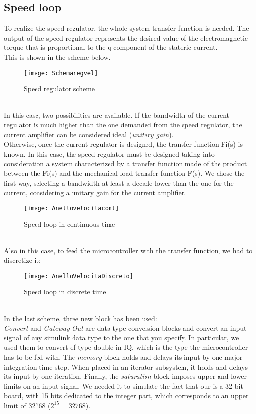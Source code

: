 \documentclass[12pt]{article}
\begin{document}
\subsection{Speed loop}
To realize the speed regulator, the whole system transfer function is needed. The output of the speed regulator represents the desired value of the electromagnetic torque that is proportional to the q component of the statoric current.\\
This is shown in the scheme below.
\begin{figure}[h]
\centering
\texttt{[image: Schemaregvel]}
\caption{Speed regulator scheme}
\end{figure}\\
In this case, two possibilities are available. If the bandwidth of the current regulator is much higher than the one demanded from the speed regulator, the current amplifier can be considered ideal (\textit{unitary gain}).\\
Otherwise, once the current regulator is designed, the transfer function Fi(s) is known.
In this case, the speed regulator must be designed taking into consideration a system characterized by a transfer function made of the product between the Fi(s) and the mechanical load transfer function F(s).
We chose the first way, selecting a bandwidth at least a decade lower than the one for the current, considering a unitary gain for the current amplifier.
\begin{figure}[h]
\centering
\texttt{[image: Anellovelocitacont]}
\caption{Speed loop in continuous time}
\end{figure}\\
Also in this case, to feed the microcontroller with the transfer function, we had to discretize it:
\begin{figure}[h]
\centering
\texttt{[image: AnelloVelocitaDiscreto]}
\caption{Speed loop in discrete time}
\end{figure}\\[0.5cm]
In the last scheme, three new block has been used:\\
\textit{Convert} and \textit{Gateway Out} are data type conversion blocks and convert an input signal of any simulink data type to the one that you specify. In particular, we used them to convert of type double in IQ, which is the type the microcontroller has to be fed with.
The \textit{memory} block holds and delays its input by one major integration time step. When placed in an iterator subsystem, it holds and delays its input by one iteration.
Finally, the \textit{saturation} block imposes upper and lower limits on an input signal. We needed it to simulate the fact that our is a 32 bit board, with 15 bits dedicated to the integer part, which corresponds to an upper limit of 32768 ($2^{15} = 32768$).
\end{document}
